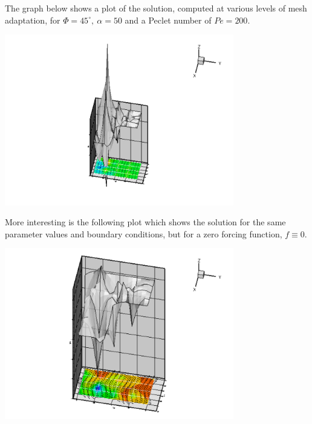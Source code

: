 The graph below shows a plot of the solution, computed at various levels of mesh adaptation, for $\Phi=45^\circ, \ \alpha=50 $ and a Peclet number of $ Pe = 200.$

 
\begin{DoxyImage}
\includegraphics[width=0.75\textwidth]{step_soln}
\end{DoxyImage}


More interesting is the following plot which shows the solution for the same parameter values and boundary conditions, but for a zero forcing function, $ f\equiv 0. $

 
\begin{DoxyImage}
\includegraphics[width=0.75\textwidth]{unforced_soln}
\end{DoxyImage}


